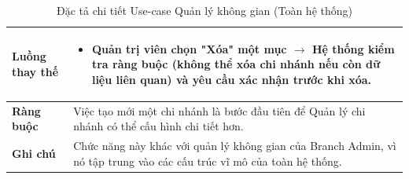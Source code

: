 \begin{table}[H]
\begin{tabular}{|p{4cm}|p{10cm}|}
\textbf{Luồng thay thế} 
& 
\begin{itemize}
    \item Quản trị viên chọn "Xóa" một mục $\rightarrow$ Hệ thống kiểm tra ràng buộc (không thể xóa chi nhánh nếu còn dữ liệu liên quan) và yêu cầu xác nhận trước khi xóa.
\end{itemize} \\ 
\hline

\textbf{Ràng buộc} 
& Việc tạo mới một chi nhánh là bước đầu tiên để Quản lý chi nhánh có thể cấu hình chi tiết hơn. \\ 
\hline

\textbf{Ghi chú} 
& Chức năng này khác với quản lý không gian của Branch Admin, vì nó tập trung vào các cấu trúc vĩ mô của toàn hệ thống. \\ 
\hline
\end{tabular}
\caption{Đặc tả chi tiết Use-case Quản lý không gian (Toàn hệ thống)}
\label{tab:sysadmin-space-spec}
\end{table}



